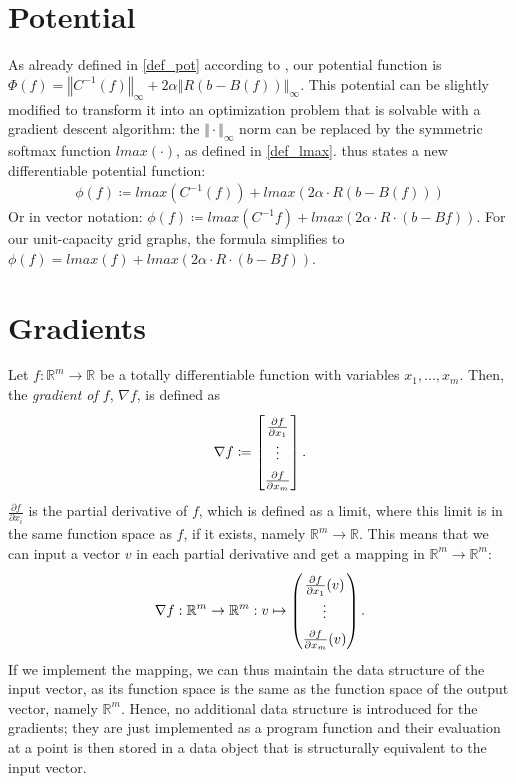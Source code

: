 \section{Potential} 
As already defined in \ref{def_pot} according to \cite{nmfnlt}, our potential function is $\Phi(f)=\left\Vert C^{-1}(f)\right\Vert_\infty+2\alpha\left\Vert R(b-B(f))\right\Vert_\infty$. This potential can be slightly modified to transform it into an optimization problem that is solvable with a gradient descent algorithm: the $\Vert\cdot\Vert_\infty$ norm can be replaced by the symmetric softmax function $lmax(\cdot )$, as defined in \ref{def_lmax}.
\cite{nmfnlt} thus states a new differentiable potential function:
\begin{align}
\phi(f)\coloneqq lmax\left( C^{-1}(f)\right)+ lmax\left(2\alpha \cdot R(b-B(f))\right)\tag{Def. of $lmax$-Potential}\label{def_pot_lmax}
\end{align}
Or in vector notation: $\phi(f)\coloneqq lmax\left( C^{-1}f\right)+ lmax\left(2\alpha \cdot R\cdot (b-Bf)\right)$. For our unit-capacity grid graphs, the formula simplifies to $\phi(f)= lmax\left( f\right)+ lmax\left(2\alpha \cdot R\cdot (b-Bf)\right)$.
 
\section{Gradients} 
Let $f:\mathbb{R}^m\rightarrow \mathbb{R}$ be a totally differentiable function with variables $x_1,...,x_m$. Then, the \textit{gradient of $f$}, $\nabla f$, is defined as
\begin{align*}
\nabla f\coloneqq
\begingroup
\renewcommand*{\arraystretch}{1.5}
\begin{bmatrix}
\frac{\partial f}{\partial x_1}\\
\vdots\\
\frac{\partial f}{\partial x_m}
\end{bmatrix}.
\endgroup
\end{align*}
 $\frac{\partial f}{\partial x_i}$ is the partial derivative of $f$, which is defined as a limit, where this limit is in the same function space as $f$, if it exists, namely $\mathbb{R}^m\rightarrow \mathbb{R}$. This means that we can input a vector $v$ in each partial derivative and get a mapping in $\mathbb{R}^m\rightarrow\mathbb{R}^m$:
\begin{align*}
\nabla f:\mathbb{R}^m\rightarrow \mathbb{R}^m:v\mapsto 
\begingroup
\renewcommand*{\arraystretch}{1.5}
\begin{pmatrix}
\frac{\partial f}{\partial x_1}(v)\\
\vdots\\
\frac{\partial f}{\partial x_m}(v)
\end{pmatrix}.
\endgroup
\end{align*}
If we implement the mapping, we can thus maintain the data structure of the input vector, as its function space is the same as the function space of the output vector, namely $\mathbb{R}^m$. Hence, no additional data structure is introduced for the gradients; they are just implemented as a program function and their evaluation at a point is then stored in a data object that is structurally equivalent to the input vector.
